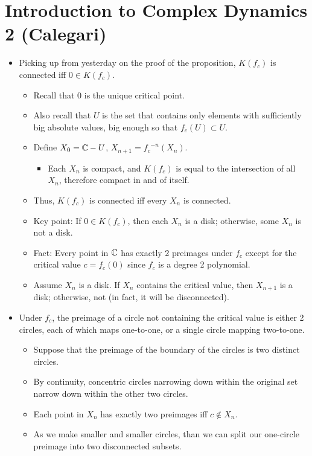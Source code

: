\documentclass[../apprentice.tex]{subfiles}
\begin{document}
\section{Introduction to Complex Dynamics 2 (Calegari)}
\begin{itemize}
    \item {}Picking up from yesterday on the proof of the proposition, $K(f_c)$ is connected iff $0\in K(f_c)$.
    \begin{itemize}
        \item Recall that 0 is the unique critical point.
        \item Also recall that $U$ is the set that contains only elements with sufficiently big absolute values, big enough so that $f_c(U)\subset U$.
        \item Define $X_0=\mathbb{C}-U$, $X_{n+1}={f_c}^{-n}(X_n)$.
        \begin{itemize}
            \item Each $X_n$ is compact, and $K(f_c)$ is equal to the intersection of all $X_n$, therefore compact in and of itself.
        \end{itemize}
        \item Thus, $K(f_c)$ is connected iff every $X_n$ is connected.
        \item Key point: If $0\in K(f_c)$, then each $X_n$ is a disk; otherwise, some $X_n$ is not a disk.
        \item Fact: Every point in $\mathbb{C}$ has exactly 2 preimages under $f_c$ except for the critical value $c=f_c(0)$ since $f_c$ is a degree 2 polynomial.
        \item Assume $X_n$ is a disk. If $X_n$ contains the critical value, then $X_{n+1}$ is a disk; otherwise, not (in fact, it will be disconnected).
    \end{itemize}
    \item Under $f_c$, the preimage of a circle not containing the critical value is either 2 circles, each of which maps one-to-one, or a single circle mapping two-to-one.
    \begin{itemize}
        \item Suppose that the preimage of the boundary of the circles is two distinct circles.
        \item By continuity, concentric circles narrowing down within the original set narrow down within the other two circles.
        \item Each point in $X_n$ has exactly two preimages iff $c\notin X_n$.
        \item As we make smaller and smaller circles, than we can split our one-circle preimage into two disconnected subsets.

\end{itemize}
\end{itemize}
\end{document}
